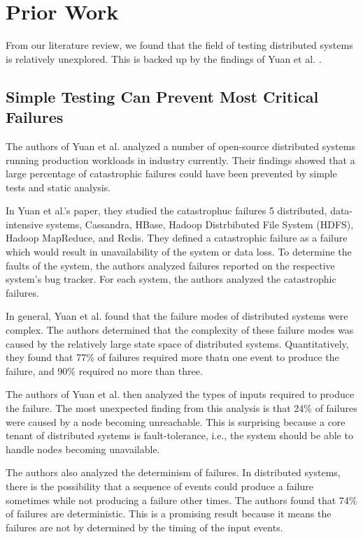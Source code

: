 \section{Prior Work}

From our literature review, we found that the field of testing distributed systems is relatively unexplored.
This is backed up by the findings of Yuan et al. \cite{simpletesting}.

\subsection{Simple Testing Can Prevent Most Critical Failures}

The authors of Yuan et al. analyzed a number of open-source distributed systems running production workloads in industry currently.
Their findings showed that a large percentage of catastrophic failures could have been prevented by simple tests and static analysis.

In Yuan et al.'s paper, they studied the catastrophuc failures 5 distributed, data-intensive systems, Cassandra, HBase, Hadoop Distrbibuted File System (HDFS), Hadoop MapReduce, and Redis.
They defined a catastrophic failure as a failure which would result in unavailability of the system or data loss.
To determine the faults of the system, the authors analyzed failures reported on the respective system's bug tracker.
For each system, the authors analyzed the catastrophic failures.

In general, Yuan et al. found that the failure modes of distributed systems were complex.
The authors determined that the complexity of these failure modes was caused by the relatively large state space of distributed systems.
Quantitatively, they found that 77\% of failures required more thatn one event to produce the failure, and 90\% required no more than three.

The authors of Yuan et al. then analyzed the types of inputs required to produce the failure.
The most unexpected finding from this analysis is that 24\% of failures were caused by a node becoming unreachable.
This is surprising because a core tenant of distributed systems is fault-tolerance, i.e., the system should be able to handle node\(s\) becoming unavailable.

The authors also analyzed the determinism of failures.
In distributed systems, there is the possibility that a sequence of events could produce a failure sometimes while not producing a failure other times.
The authors found that 74\% of failures are deterministic.
This is a promising result because it means the failures are not by determined by the timing of the input events.

